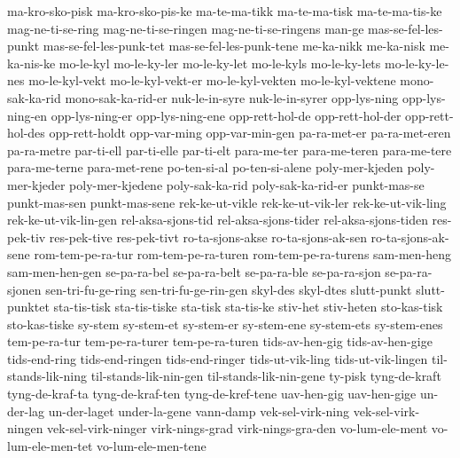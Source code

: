 {ma-kro-sko-pisk ma-kro-sko-pis-ke
ma-te-ma-tikk
ma-te-ma-tisk ma-te-ma-tis-ke  
mag-ne-ti-se-ring mag-ne-ti-se-ringen mag-ne-ti-se-ringens
man-ge
mas-se-fel-les-punkt mas-se-fel-les-punk-tet mas-se-fel-les-punk-tene
me-ka-nikk me-ka-nisk me-ka-nis-ke
mo-le-kyl mo-le-ky-ler mo-le-ky-let mo-le-kyls mo-le-ky-lets mo-le-ky-le-nes
mo-le-kyl-vekt mo-le-kyl-vekt-er mo-le-kyl-vekten mo-le-kyl-vektene
mono-sak-ka-rid mono-sak-ka-rid-er
nuk-le-in-syre nuk-le-in-syrer
opp-lys-ning opp-lys-ning-en opp-lys-ning-er opp-lys-ning-ene
opp-rett-hol-de opp-rett-hol-der opp-rett-hol-des opp-rett-holdt
opp-var-ming opp-var-min-gen
pa-ra-met-er pa-ra-met-eren pa-ra-metre
par-ti-ell par-ti-elle par-ti-elt
para-me-ter para-me-teren para-me-tere para-me-terne para-met-rene
po-ten-si-al po-ten-si-alene
poly-mer-kjeden poly-mer-kjeder poly-mer-kjedene
poly-sak-ka-rid poly-sak-ka-rid-er
punkt-mas-se punkt-mas-sen punkt-mas-sene
rek-ke-ut-vikle rek-ke-ut-vik-ler rek-ke-ut-vik-ling rek-ke-ut-vik-lin-gen
rel-aksa-sjons-tid rel-aksa-sjons-tider rel-aksa-sjons-tiden
res-pek-tiv res-pek-tive res-pek-tivt
ro-ta-sjons-akse ro-ta-sjons-ak-sen ro-ta-sjons-ak-sene
rom-tem-pe-ra-tur rom-tem-pe-ra-turen rom-tem-pe-ra-turens
sam-men-heng sam-men-hen-gen
se-pa-ra-bel se-pa-ra-belt se-pa-ra-ble
se-pa-ra-sjon se-pa-ra-sjonen
sen-tri-fu-ge-ring sen-tri-fu-ge-rin-gen
skyl-des skyl-dtes
slutt-punkt slutt-punktet
sta-tis-tisk sta-tis-tiske
sta-tisk sta-tis-ke
stiv-het stiv-heten
sto-kas-tisk sto-kas-tiske
sy-stem sy-stem-et sy-stem-er sy-stem-ene sy-stem-ets sy-stem-enes
tem-pe-ra-tur tem-pe-ra-turer tem-pe-ra-turen
tids-av-hen-gig tids-av-hen-gige
tids-end-ring tids-end-ringen tids-end-ringer
tids-ut-vik-ling tids-ut-vik-lingen
til-stands-lik-ning til-stands-lik-nin-gen til-stands-lik-nin-gene
ty-pisk
tyng-de-kraft tyng-de-kraf-ta tyng-de-kraf-ten tyng-de-kref-tene
uav-hen-gig uav-hen-gige
un-der-lag un-der-laget under-la-gene
vann-damp
vek-sel-virk-ning vek-sel-virk-ningen vek-sel-virk-ninger
virk-nings-grad virk-nings-gra-den
vo-lum-ele-ment vo-lum-ele-men-tet vo-lum-ele-men-tene
}
